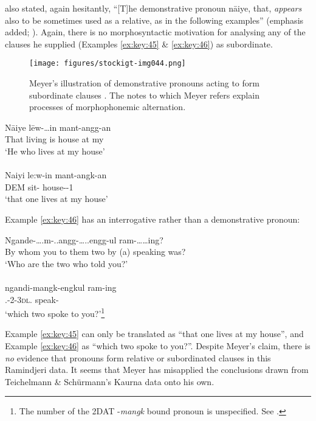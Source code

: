\citet[32]{meyer_vocabulary_1843} also stated, again hesitantly, “[T]he demonstrative pronoun nāiye, that, \textit{appears} also to be sometimes used as a relative, as in the following examples” (emphasis added; ). Again, there is no morphosyntactic motivation for analysing any of the clauses he supplied (Examples \ref{ex:key:45} \& \ref{ex:key:46}) as subordinate.

\begin{figure}
\texttt{[image: figures/stockigt-img044.png]}
\caption{Meyer’s illustration of demonstrative pronouns acting to form subordinate clauses \citeyearpar[32]{meyer_vocabulary_1843}. The notes to which Meyer refers explain processes of morphophonemic alternation.}
\label{fig:key:103}
\end{figure}

\ea\label{ex:key:45}
	\gll Nāiye lēw-…in mant-angg-an \\
	That {living  is} {house at my} \\
	\glt `He who lives at my house' \\
	\citep[32]{meyer_vocabulary_1843} \\
	\gll Naiyi le:w-in mant-angk-an \\
	DEM sit- house--1 \\
	\glt `that one lives at my house'
\z

Example \ref{ex:key:46} has an interrogative rather than a demonstrative pronoun:

\ea\label{ex:key:46} %
	\gll  Ngande-….m-..angg-…..engg-ul {}  ram-……ing? \\
    {By whom you to them two}  {by (a)} {speaking was}? \\
	\glt `Who are the two who told you?' \\
	\citep[32]{meyer_vocabulary_1843} \\
	\gll ngandi-mangk-engkul ram-ing \\
	.-2-3\textsc{dl}. speak-\\
	\glt `which two spoke to you?'\footnote{The number of the 2DAT -\textit{mangk} bound pronoun is unspecified. See .}
\z

Example \ref{ex:key:45} can only be translated as ``that one lives at my house'', and Example \ref{ex:key:46} as ``which two spoke to you?''. Despite Meyer’s claim, there is \textit{no} evidence that pronouns form relative or subordinated clauses in this Ramindjeri data. It seems that Meyer has misapplied the conclusions drawn from Teichelmann \& Schürmann’s Kaurna data onto his own.

